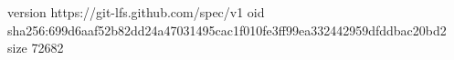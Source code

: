 version https://git-lfs.github.com/spec/v1
oid sha256:699d6aaf52b82dd24a47031495cac1f010fe3ff99ea332442959dfddbac20bd2
size 72682
